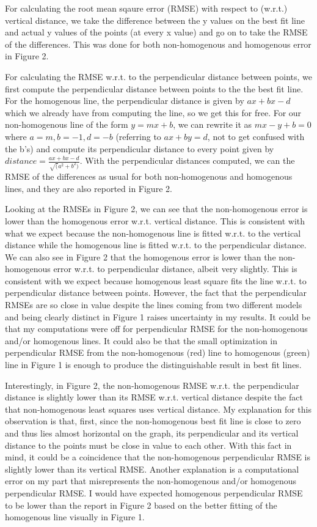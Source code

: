 \documentclass[12pt]{report}
\begin{document}
\begin{enumerate}
  For calculating the root mean sqaure error (RMSE) with respect to (w.r.t.)
  vertical distance, we take the difference between the y values on the best fit
  line and actual y values of the points (at every x value) and go on to take
  the RMSE of the differences. This was done for both non-homogenous and
  homogenous error in Figure 2.
  
  For calculating the RMSE w.r.t. to the perpendicular distance between points,
  we first compute the perpendicular distance between points to the the best fit
  line.  For the homogenous line, the perpendicular distance is given by $ax +
  bx - d$ which we already have from computing the line, so we get this for
  free. For our non-homogenous line of the form $y=mx+b$, we can rewrite it as
  $mx-y+b=0$ where $a=m, b=-1, d=-b$ (referring to $ax+by=d$, not to get
  confused with the b's) and compute its perpendicular distance to every point
  given by $distance=\frac{ax+bx-d}{\sqrt(a^2+b^2)}$. With the perpendicular
  distances computed, we can the RMSE of the differences as usual for both
  non-homogenous and homogenous lines, and they are also reported in Figure 2.
  
  Looking at the RMSEs in Figure 2, we can see that the non-homogenous error is
  lower than the homogenous error w.r.t. vertical distance. This is consistent
  with what we expect because the non-homogenous line is fitted w.r.t. to the
  vertical distance while the homogenous line is fitted w.r.t. to the
  perpendicular distance. We can also see in Figure 2 that the homogenous error
  is lower than the non-homogenous error w.r.t. to perpendicular distance,
  albeit very slightly. This is consistent with we expect because homogenous
  least square fits the line w.r.t. to perpendicular distance between
  points. However, the fact that the perpendicular RMSEs are so close in value
  despite the lines coming from two different models and being clearly distinct
  in Figure 1 raises uncertainty in my results. It could be that my computations
  were off for perpendicular RMSE for the non-homogenous and/or homogenous
  lines. It could also be that the small optimization in perpendicular RMSE from
  the non-homogenous (red) line to homogenous (green) line in Figure 1 is enough
  to produce the distinguishable result in best fit lines.
  
  
  Interestingly, in Figure 2, the non-homogenous RMSE w.r.t. the perpendicular
  distance is slightly lower than its RMSE w.r.t. vertical distance despite the
  fact that non-homogenous least squares uses vertical distance. My explanation
  for this observation is that, first, since the non-homogenous best fit line is
  close to zero and thus lies almost horizontal on the graph, its perpendicular
  and its vertical distance to the points must be close in value to each
  other. With this fact in mind, it could be a coincidence that the
  non-homogenous perpendicular RMSE is slightly lower than its vertical
  RMSE. Another explanation is a computational error on my part that
  misrepresents the non-homogenous and/or homogenous perpendicular RMSE. I would
  have expected homogenous perpendicular RMSE to be lower than the report in
  Figure 2 based on the better fitting of the homogenous line visually in Figure
  1.
  

\end{enumerate}
\end{document}
